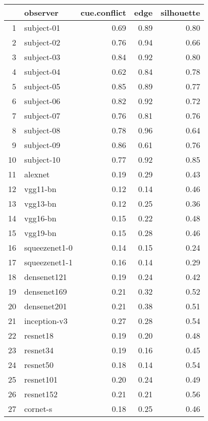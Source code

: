 \begin{table}[ht]
\centering
\begin{tabular}{rlrrr}
  \hline
 & observer & cue.conflict & edge & silhouette \\ 
  \hline
1 & subject-01 & 0.69 & 0.89 & 0.80 \\ 
  2 & subject-02 & 0.76 & 0.94 & 0.66 \\ 
  3 & subject-03 & 0.84 & 0.92 & 0.80 \\ 
  4 & subject-04 & 0.62 & 0.84 & 0.78 \\ 
  5 & subject-05 & 0.85 & 0.89 & 0.77 \\ 
  6 & subject-06 & 0.82 & 0.92 & 0.72 \\ 
  7 & subject-07 & 0.76 & 0.81 & 0.76 \\ 
  8 & subject-08 & 0.78 & 0.96 & 0.64 \\ 
  9 & subject-09 & 0.86 & 0.61 & 0.76 \\ 
  10 & subject-10 & 0.77 & 0.92 & 0.85 \\ 
  11 & alexnet & 0.19 & 0.29 & 0.43 \\ 
  12 & vgg11-bn & 0.12 & 0.14 & 0.46 \\ 
  13 & vgg13-bn & 0.12 & 0.25 & 0.36 \\ 
  14 & vgg16-bn & 0.15 & 0.22 & 0.48 \\ 
  15 & vgg19-bn & 0.15 & 0.28 & 0.46 \\ 
  16 & squeezenet1-0 & 0.14 & 0.15 & 0.24 \\ 
  17 & squeezenet1-1 & 0.16 & 0.14 & 0.29 \\ 
  18 & densenet121 & 0.19 & 0.24 & 0.42 \\ 
  19 & densenet169 & 0.21 & 0.32 & 0.52 \\ 
  20 & densenet201 & 0.21 & 0.38 & 0.51 \\ 
  21 & inception-v3 & 0.27 & 0.28 & 0.54 \\ 
  22 & resnet18 & 0.19 & 0.20 & 0.48 \\ 
  23 & resnet34 & 0.19 & 0.16 & 0.45 \\ 
  24 & resnet50 & 0.18 & 0.14 & 0.54 \\ 
  25 & resnet101 & 0.20 & 0.24 & 0.49 \\ 
  26 & resnet152 & 0.21 & 0.21 & 0.56 \\ 
  27 & cornet-s & 0.18 & 0.25 & 0.46 \\ 
   \hline
\end{tabular}
\end{table}
